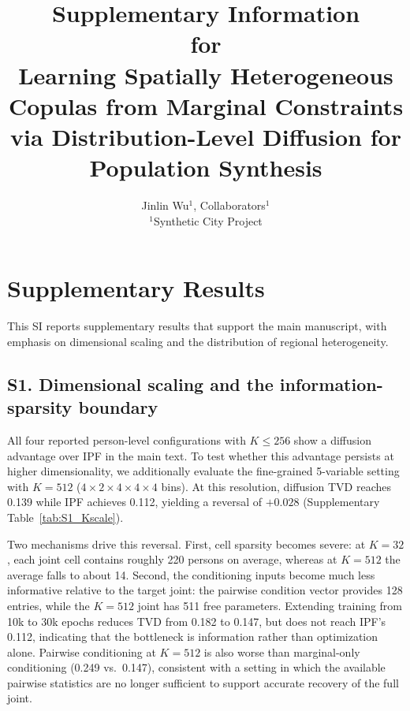 \documentclass[11pt]{article}
\title{\textbf{Supplementary Information}\\
for\\
\textbf{Learning Spatially Heterogeneous Copulas from Marginal Constraints\\
via Distribution-Level Diffusion for Population Synthesis}}
\author{Jinlin Wu$^{1}$, Collaborators$^{1}$\\
\small $^{1}$Synthetic City Project}
\date{}
\begin{document}
\maketitle
\onehalfspacing
\renewcommand{\figurename}{Supplementary Fig.}
\renewcommand{\thefigure}{S\arabic{figure}}
\renewcommand{\tablename}{Supplementary Table}
\renewcommand{\thetable}{S\arabic{table}}

\section{Supplementary Results}

This SI reports supplementary results that support the main manuscript, with emphasis on dimensional scaling and the distribution of regional heterogeneity.

\subsection{S1. Dimensional scaling and the information-sparsity boundary}

All four reported person-level configurations with $K\leq256$ show a diffusion advantage over IPF in the main text. To test whether this advantage persists at higher dimensionality, we additionally evaluate the fine-grained 5-variable setting with $K=512$ ($4\times2\times4\times4\times4$ bins). At this resolution, diffusion TVD reaches 0.139 while IPF achieves 0.112, yielding a reversal of $+0.028$ (Supplementary Table~\ref{tab:S1_Kscale}).

Two mechanisms drive this reversal. First, cell sparsity becomes severe: at $K=32$, each joint cell contains roughly 220 persons on average, whereas at $K=512$ the average falls to about 14. Second, the conditioning inputs become much less informative relative to the target joint: the pairwise condition vector provides 128 entries, while the $K=512$ joint has 511 free parameters. Extending training from 10k to 30k epochs reduces TVD from 0.182 to 0.147, but does not reach IPF's 0.112, indicating that the bottleneck is information rather than optimization alone. Pairwise conditioning at $K=512$ is also worse than marginal-only conditioning (0.249 vs.\ 0.147), consistent with a setting in which the available pairwise statistics are no longer sufficient to support accurate recovery of the full joint.
\end{document}
